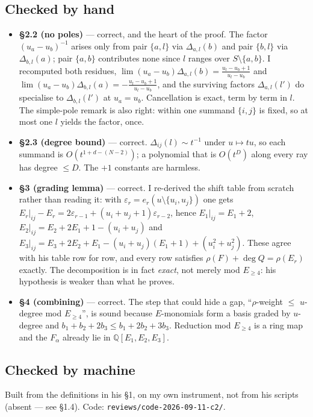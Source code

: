 \documentclass[11pt,a4paper]{article}
\newcommand{\rr}[1]{\texttt{#1}}
\begin{document}
\subsection{Checked by hand}
\begin{itemize}
\item \textbf{\S2.2 (no poles)} --- correct, and the heart of the proof. The factor
$(u_a-u_b)^{-1}$ arises only from pair $\{a,l\}$ via $\Delta_{a,l}(b)$ and pair $\{b,l\}$
via $\Delta_{b,l}(a)$; pair $\{a,b\}$ contributes none since $l$ ranges over
$S\setminus\{a,b\}$. I recomputed both residues,
$\lim(u_a-u_b)\Delta_{a,l}(b)=\frac{u_l-u_b+1}{u_l-u_b}$ and
$\lim(u_a-u_b)\Delta_{b,l}(a)=-\frac{u_l-u_b+1}{u_l-u_b}$,
and the surviving factors $\Delta_{a,l}(l')$ do specialise to $\Delta_{b,l}(l')$ at
$u_a=u_b$. Cancellation is exact, term by term in $l$. The simple-pole remark is also
right: within one summand $\{i,j\}$ is fixed, so at most one $l$ yields the factor, once.
\item \textbf{\S2.3 (degree bound)} --- correct. $\Delta_{ij}(l)\sim t^{-1}$ under
$u\mapsto tu$, so each summand is $O(t^{1+d-(N-2)})$; a polynomial that is $O(t^D)$ along
every ray has degree $\le D$. The $+1$ constants are harmless.
\item \textbf{\S3 (grading lemma)} --- correct. I re-derived the shift table from scratch
rather than reading it: with $\varepsilon_r=e_r(u\setminus\{u_i,u_j\})$ one gets
$E_r|_{ij}-E_r=2\varepsilon_{r-1}+(u_i+u_j+1)\varepsilon_{r-2}$, hence
$E_1|_{ij}=E_1+2$, $E_2|_{ij}=E_2+2E_1+1-(u_i+u_j)$ and
$E_3|_{ij}=E_3+2E_2+E_1-(u_i+u_j)(E_1+1)+(u_i^2+u_j^2)$. These agree with his table row
for row, and every row satisfies $\rho(F)+\deg Q=\rho(E_r)$ exactly. The decomposition is
in fact \emph{exact}, not merely mod $E_{\ge4}$: his hypothesis is weaker than what he proves.
\item \textbf{\S4 (combining)} --- correct. The step that could hide a gap,
``$\rho$-weight $\le$ $u$-degree mod $E_{\ge4}$'', is sound because $E$-monomials form a
basis graded by $u$-degree and $b_1+b_2+2b_3\le b_1+2b_2+3b_3$. Reduction mod $E_{\ge4}$
is a ring map and the $F_\alpha$ already lie in $\mathbb Q[E_1,E_2,E_3]$.
\end{itemize}

\subsection{Checked by machine}
Built from the definitions in his \S1, on my own instrument, not from his scripts (absent
--- see \S1.4). Code: \rr{reviews/code-2026-09-11-c2/}.
\end{document}
